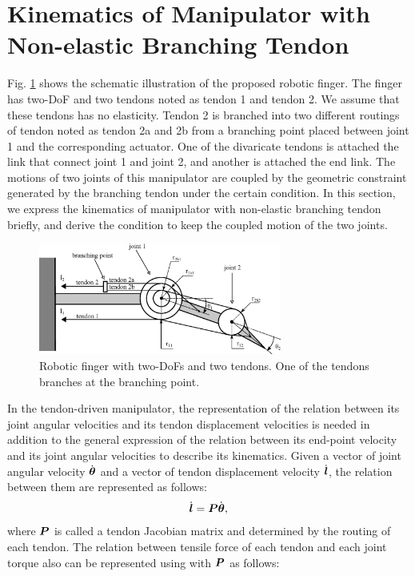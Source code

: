 \documentclass{llncs}
\def\vect#1{\mbox{\boldmath$#1$}}
\begin{document}
\section{Kinematics of Manipulator with Non-elastic Branching Tendon}
Fig. \ref{branching_model} shows the schematic illustration of the proposed robotic finger.
The finger has two-DoF and two tendons noted as tendon 1 and tendon 2.
We assume that these tendons has no elasticity.
Tendon 2 is branched into two different routings of tendon noted as tendon 2a and 2b from a branching point placed between joint 1 and the corresponding actuator.
One of the divaricate tendons is attached the link that connect joint 1 and joint 2, and another is attached the end link.
The motions of two joints of this manipulator are coupled by the geometric constraint generated by the branching tendon under the certain condition.
In this section, we express the kinematics of manipulator with non-elastic branching tendon briefly, and derive the condition to keep the coupled motion of the two joints. 
\begin{figure}[t]
	\centering
	\includegraphics[width=80mm]{fig/coupled.eps}
	\caption{Robotic finger with two-DoFs and two tendons. One of the tendons branches at the branching point.}
	\label{branching_model}
\end{figure}
In the tendon-driven manipulator, the representation of the relation between its joint angular velocities and its tendon displacement velocities is needed in addition to the general expression of the relation between its end-point velocity and its joint angular velocities to describe its kinematics.
Given a vector of joint angular velocity $\dot{\vect{\theta}}$ and a vector of tendon displacement velocity $\dot{\vect{l}}$, the relation between them are represented as follows:
\begin{align}
	\dot{\vect{l}}=\vect{P}\dot{\vect{\theta}},
	\label{jaco}
\end{align}
where $\vect{P}$ is called a tendon Jacobian matrix and determined by the routing of each tendon.
The relation between tensile force of each tendon and each joint torque also can be represented using with $\vect{P}$ as follows:
\end{document}
